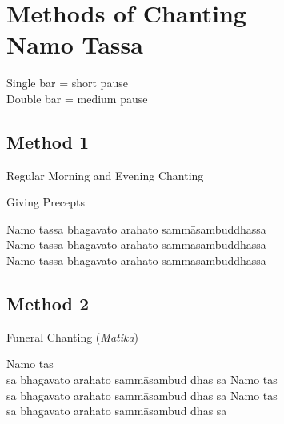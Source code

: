 \chapter[Methods of Chanting Namo Tassa]{Methods of Chanting\\ Namo Tassa}

\vspace*{-12pt}

Single bar \textbar{} = short pause\\
Double bar \textbar\textbar{} = medium pause

\vspace*{-3pt}

\section*{Method 1}

\vspace*{-5pt}

\begin{packeditemize}
\item Regular Morning and Evening Chanting
\item Giving Precepts
\end{packeditemize}

\bigskip

{\smaller
Namo tassa bhagavato arahato sammāsambuddhassa \textbar\textbar{}\\
Namo tassa bhagavato arahato sammāsambuddhassa \textbar\textbar{}\\
Namo tassa bhagavato arahato sammāsambuddhassa
}

\section*{Method 2}

\vspace*{-5pt}

\begin{packeditemize}
\item Funeral Chanting (\emph{Matika})
\end{packeditemize}

\bigskip

{\smaller
Namo tas \textbar\textbar{}\\
sa bhagavato arahato sammāsambud \textbar\textbar{} dhas \textbar\textbar{} sa Namo tas \textbar\textbar{}\\
sa bhagavato arahato sammāsambud \textbar\textbar{} dhas \textbar\textbar{} sa Namo tas \textbar\textbar{}\\
sa bhagavato arahato sammāsambud \textbar\textbar{} dhas \textbar\textbar{} sa
}

